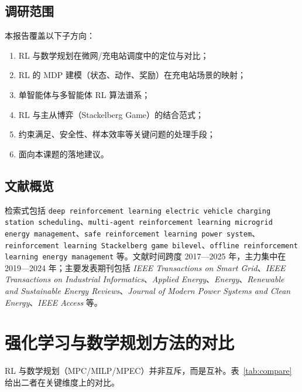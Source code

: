 \documentclass[UTF8,a4paper,11pt]{ctexart}
\begin{document}
\subsection{调研范围}
本报告覆盖以下子方向：
\begin{enumerate}
  \item RL 与数学规划在微网/充电站调度中的定位与对比；
  \item RL 的 MDP 建模（状态、动作、奖励）在充电站场景的映射；
  \item 单智能体与多智能体 RL 算法谱系；
  \item RL 与主从博弈（Stackelberg Game）的结合范式；
  \item 约束满足、安全性、样本效率等关键问题的处理手段；
  \item 面向本课题的落地建议。
\end{enumerate}

\subsection{文献概览}
\begin{sloppypar}
检索式包括 \texttt{deep reinforcement learning electric vehicle charging station scheduling}、\texttt{multi-agent reinforcement learning microgrid energy management}、\texttt{safe reinforcement learning power system}、\texttt{reinforcement learning Stackelberg game bilevel}、\texttt{offline reinforcement learning energy management} 等。文献时间跨度 2017—2025 年，主力集中在 2019—2024 年；主要发表期刊包括 \textit{IEEE Transactions on Smart Grid}、\textit{IEEE Transactions on Industrial Informatics}、\textit{Applied Energy}、\textit{Energy}、\textit{Renewable and Sustainable Energy Reviews}、\textit{Journal of Modern Power Systems and Clean Energy}、\textit{IEEE Access} 等。
\end{sloppypar}

\section{强化学习与数学规划方法的对比}

RL 与数学规划（MPC/MILP/MPEC）并非互斥，而是互补。表~\ref{tab:compare} 给出二者在关键维度上的对比。
\end{document}
